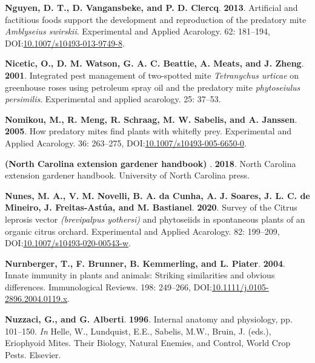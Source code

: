 \documentclass[12pt,final,CPage]{ufthesis}
\newlength{\cslhangindent}
\newenvironment{CSLReferences}[2] %
{%
	\setlength{\parindent}{0pt}
	\ifodd #1 \everypar{\setlength{\hangindent}{\cslhangindent}}\ignorespaces\fi
	\ifnum #2 > 0
	\setlength{\parskip}{#2\baselineskip}
	\fi
}%
{}
\begin{document}
{\begin{CSLReferences}{1}{0}
  \leavevmode{}%
  \textbf{Nguyen, D. T., D. Vangansbeke, and P. D. Clercq}. \textbf{2013}. Artificial and factitious foods support the development and reproduction of the predatory mite {\emph{Amblyseius swirskii}}. Experimental and Applied Acarology. 62: 181--194, DOI:\href{https://doi.org/10.1007/s10493-013-9749-8}{10.1007/s10493-013-9749-8}.

  \leavevmode{}%
  \textbf{Nicetic, O., D. M. Watson, G. A. C. Beattie, A. Meats, and J. Zheng}. \textbf{2001}. Integrated pest management of two-spotted mite {\emph{Tetranychus urticae}} on greenhouse roses using petroleum spray oil and the predatory mite \emph{phytoseiulus persimilis}. Experimental and applied acarology. 25: 37--53.

  \leavevmode{}%
  \textbf{Nomikou, M., R. Meng, R. Schraag, M. W. Sabelis, and A. Janssen}. \textbf{2005}. How predatory mites find plants with whitefly prey. Experimental and Applied Acarology. 36: 263--275, DOI:\href{https://doi.org/10.1007/s10493-005-6650-0}{10.1007/s10493-005-6650-0}.

  \leavevmode{}%
  \textbf{({North Carolina} extension gardener handbook) }. \textbf{2018}. {North Carolina} extension gardener handbook. University of {North Carolina} press.

  \leavevmode{}%
  \textbf{Nunes, M. A., V. M. Novelli, B. A. da Cunha, A. J. Soares, J. L. C. de Mineiro, J. Freitas-Astúa, and M. Bastianel}. \textbf{2020}. Survey of the {Citrus leprosis} vector \emph{(brevipalpus yothersi)} and phytoseiids in spontaneous plants of an organic citrus orchard. Experimental and Applied Acarology. 82: 199--209, DOI:\href{https://doi.org/10.1007/s10493-020-00543-w}{10.1007/s10493-020-00543-w}.

  \leavevmode{}%
  \textbf{Nurnberger, T., F. Brunner, B. Kemmerling, and L. Piater}. \textbf{2004}. Innate immunity in plants and animals: Striking similarities and obvious differences. Immunological Reviews. 198: 249--266, DOI:\href{https://doi.org/10.1111/j.0105-2896.2004.0119.x}{10.1111/j.0105-2896.2004.0119.x}.

  \leavevmode{}%
  \textbf{Nuzzaci, G., and G. Alberti}. \textbf{1996}. Internal anatomy and physiology, pp. 101--150. \emph{In} Helle, W., Lundquist, E.E., Sabelis, M.W., Bruin, J. (eds.), Eriophyoid Mites. Their Biology, Natural Enemies, and Control, World Crop Pests. Elsevier.


\end{CSLReferences}}
\end{document}
